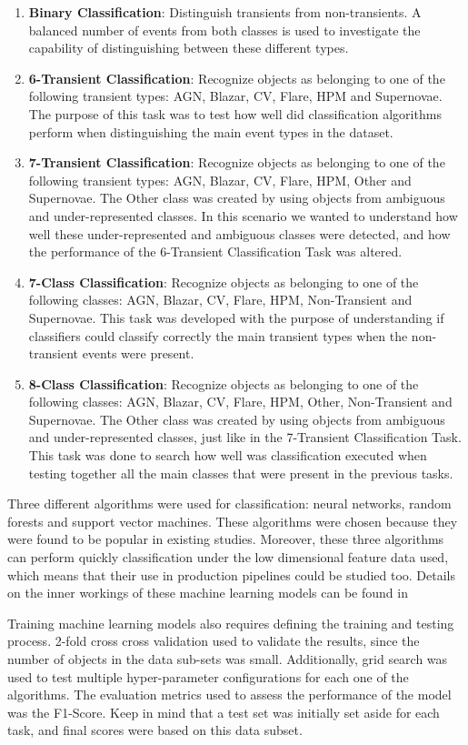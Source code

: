 \begin{enumerate}
    \item \textbf{Binary Classification}: 
    Distinguish transients from non-transients. A balanced number of events from both classes is used to investigate the capability of distinguishing between these different types.
    \item \textbf{6-Transient Classification}: Recognize objects as belonging to one of the following transient types: AGN, Blazar, CV, Flare, HPM and Supernovae. The purpose of this task was to test how well did classification algorithms perform when distinguishing the main event types in the dataset.
    \item \textbf{7-Transient Classification}: Recognize objects as belonging to one of the following transient types: AGN, Blazar, CV, Flare, HPM, Other and Supernovae. The Other class was created by using objects from ambiguous and under-represented classes. In this scenario we wanted to understand how well these under-represented and ambiguous classes were detected, and how the performance of the 6-Transient Classification Task was altered.
    \item \textbf{7-Class Classification}: Recognize objects as belonging to one of the following classes: AGN, Blazar, CV, Flare, HPM, Non-Transient and Supernovae. This task was developed with the purpose of understanding if classifiers could classify correctly the main transient types when the non-transient events were present.
    \item \textbf{8-Class Classification}: Recognize objects as belonging to one of the following classes: AGN, Blazar, CV, Flare, HPM, Other, Non-Transient and Supernovae. The Other class was created by using objects from ambiguous and under-represented classes, just like in the 7-Transient Classification Task. This task was done to search how well was classification executed when testing together all the main classes that were present in the previous tasks.
\end{enumerate}

Three different algorithms were used for classification: neural networks, random forests and support vector machines. These algorithms were chosen because they were found to be popular in existing studies. Moreover, these three algorithms can perform quickly classification under the low dimensional feature data used, which means that their use in production pipelines could be studied too. Details on the inner workings of these machine learning models can be found in \cite{9780387848570}

Training machine learning models also requires defining the training and testing process. 2-fold cross cross validation used to validate the results, since the number of objects in the data sub-sets was small. Additionally, grid search was used to test multiple hyper-parameter configurations for each one of the algorithms. The evaluation metrics used to assess the performance of the model was the F1-Score. Keep in mind that a test set was initially set aside for each task, and final scores were based on this data subset.